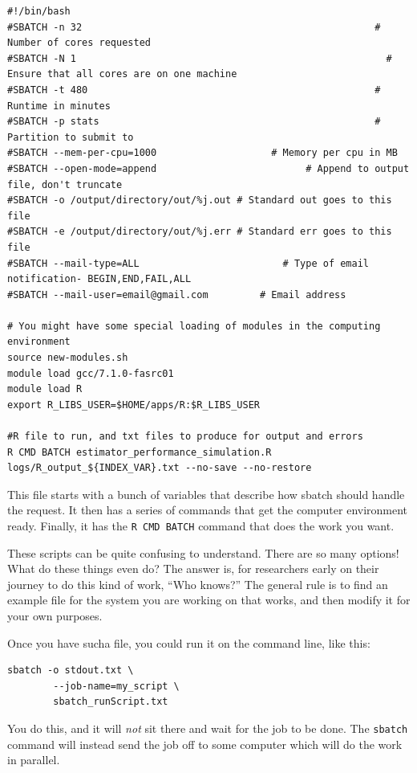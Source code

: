 \documentclass[
]{book}
\begin{document}
\begin{verbatim}
#!/bin/bash
#SBATCH -n 32                                                   # Number of cores requested
#SBATCH -N 1                                                      # Ensure that all cores are on one machine
#SBATCH -t 480                                                  # Runtime in minutes
#SBATCH -p stats                                                # Partition to submit to
#SBATCH --mem-per-cpu=1000                    # Memory per cpu in MB
#SBATCH --open-mode=append                          # Append to output file, don't truncate
#SBATCH -o /output/directory/out/%j.out # Standard out goes to this file
#SBATCH -e /output/directory/out/%j.err # Standard err goes to this file
#SBATCH --mail-type=ALL                         # Type of email notification- BEGIN,END,FAIL,ALL
#SBATCH --mail-user=email@gmail.com         # Email address

# You might have some special loading of modules in the computing environment
source new-modules.sh
module load gcc/7.1.0-fasrc01
module load R
export R_LIBS_USER=$HOME/apps/R:$R_LIBS_USER

#R file to run, and txt files to produce for output and errors
R CMD BATCH estimator_performance_simulation.R logs/R_output_${INDEX_VAR}.txt --no-save --no-restore
\end{verbatim}

This file starts with a bunch of variables that describe how sbatch should handle the request.
It then has a series of commands that get the computer environment ready.
Finally, it has the \texttt{R\ CMD\ BATCH} command that does the work you want.

These scripts can be quite confusing to understand.
There are so many options!
What do these things even do?
The answer is, for researchers early on their journey to do this kind of work, ``Who knows?''
The general rule is to find an example file for the system you are working on that works, and then modify it for your own purposes.

Once you have sucha file, you could run it on the command line, like this:

\begin{verbatim}
sbatch -o stdout.txt \
        --job-name=my_script \
        sbatch_runScript.txt
\end{verbatim}

You do this, and it will \emph{not} sit there and wait for the job to be done.
The \texttt{sbatch} command will instead send the job off to some computer which will do the work in parallel.
\end{document}
